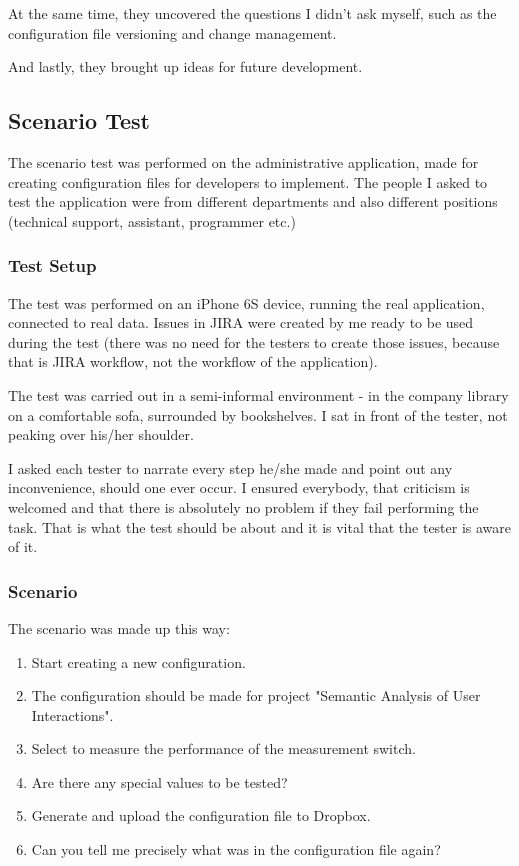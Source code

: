 At the same time, they uncovered the questions I didn't ask myself, such as the configuration file versioning and change management.

And lastly, they brought up ideas for future development.

\subsection{Scenario Test}

The scenario test was performed on the administrative application, made for creating configuration files for developers to implement. The people I asked to test the application were from different departments and also different positions (technical support, assistant, programmer etc.)

\subsubsection{Test Setup}

The test was performed on an iPhone 6S device, running the real application, connected to real data. Issues in JIRA were created by me ready to be used during the test (there was no need for the testers to create those issues, because that is JIRA workflow, not the workflow of the application).

The test was carried out in a semi-informal environment - in the company library on a comfortable sofa, surrounded by bookshelves. I sat in front of the tester, not peaking over his/her shoulder. 

I asked each tester to narrate every step he/she made and point out any inconvenience, should one ever occur. I ensured everybody, that criticism is welcomed and that there is absolutely no problem if they fail performing the task. That is what the test should be about and it is vital that the tester is aware of it.

\newpage

\subsubsection{Scenario}

The scenario was made up this way:

\begin{enumerate}
	\item Start creating a new configuration.
	\item The configuration should be made for project "Semantic Analysis of User Interactions".
	\item Select to measure the performance of the measurement switch.
	\item Are there any special values to be tested?
	\item Generate and upload the configuration file to Dropbox.
	\item Can you tell me precisely what was in the configuration file again?
\end{enumerate}

